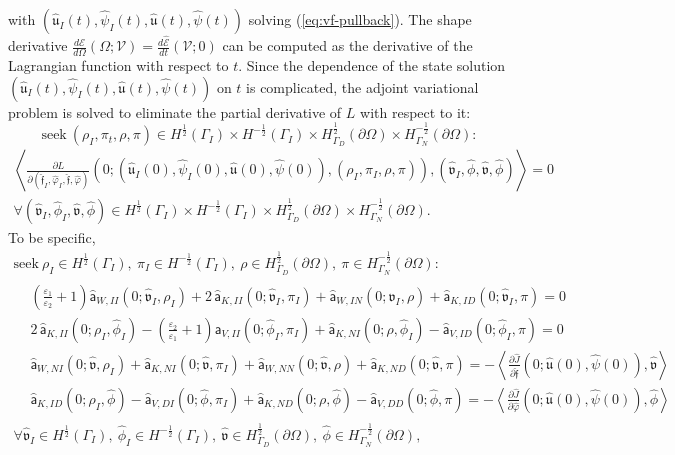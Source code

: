 \documentclass{article}
\theoremstyle{remark}
\newcommand{\aaa}{\mathsf{a}}
\newcommand{\hata}{\widehat{\aaa}}
\newcommand{\argu}{\mathfrak{u}}
\newcommand{\argv}{\mathfrak{v}}
\newcommand{\argf}{\mathfrak{f}}
\newcommand{\hatu}{\widehat{\argu}}
\newcommand{\hatv}{\widehat{\argv}}
\newcommand{\hatf}{\widehat{\argf}}
\newcommand{\hatpsi}{\widehat{\psi}}
\newcommand{\hatphi}{\widehat{\phi}}
\newcommand{\hatvphi}{\widehat{\varphi}}
\newcommand{\Eps}{\mathcal{E}}
\newcommand{\hatEps}{\widehat{\Eps}}
\newcommand{\hatJ}{\widehat{J}}
\newcommand{\Nu}{\mathcal{V}}
\begin{document}
with $(\hatu_I(t),\hatpsi_I(t),\hatu(t),\hatpsi(t))$ solving (\ref{eq:vf-pullback}). The shape derivative $\frac{d\Eps}{d\Omega}(\Omega;\Nu)=\frac{d\hatEps}{dt}(\Nu;0)$ can be computed as the derivative of the Lagrangian function with respect to $t$. Since the dependence of the state solution $(\hatu_I(t),\hatpsi_I(t),\hatu(t),\hatpsi(t))$ on $t$ is complicated, the adjoint variational problem is solved to eliminate the partial derivative of $L$ with respect to it:
\begin{equation*}
    \text{seek}~(\rho_I,\pi_t,\rho,\pi)\in H^{\frac{1}{2}}(\Gamma_I)\times H^{-\frac{1}{2}}(\Gamma_I)\times H^{\frac{1}{2}}_{\Gamma_D}(\partial\Omega)\times H^{-\frac{1}{2}}_{\Gamma_N}(\partial\Omega):
\end{equation*}
\begin{multline}
    \left<\frac{\partial L}{\partial(\hatf_I,\hatvphi_I,\hatf,\hatvphi)}(0;(\hatu_I(0),\hatpsi_I(0),\hatu(0),\hatpsi(0)),(\rho_I,\pi_I,\rho,\pi)),(\hatv_I,\hatphi,\hatv,\hatphi)\right>=0\\
    \forall(\hatv_I,\hatphi_I,\hatv,\hatphi)\in H^{\frac{1}{2}}(\Gamma_I)\times H^{-\frac{1}{2}}(\Gamma_I)\times H^{\frac{1}{2}}_{\Gamma_D}(\partial\Omega)\times H^{-\frac{1}{2}}_{\Gamma_N}(\partial\Omega).
\end{multline}
To be specific,
\begin{equation}
\begin{gathered}
    \text{seek}~\rho_I\in H^{\frac{1}{2}}(\Gamma_I),
    ~\pi_I\in H^{-\frac{1}{2}}(\Gamma_I),
    ~\rho\in H^{\frac{1}{2}}_{\Gamma_D}(\partial\Omega),
    ~\pi\in H^{-\frac{1}{2}}_{\Gamma_N}(\partial\Omega):\\
    \begin{aligned}
    &\left(\frac{\varepsilon_1}{\varepsilon_2}+1\right)\hata_{W,II}(0;\hatv_I,\rho_I)+2\,\hata_{K,II}(0;\hatv_I,\pi_I)+\hata_{W,IN}(0;\hatv_I,\rho)+\hata_{K,ID}(0;\hatv_I,\pi)=0\quad
    \\
    &2\,\hata_{K,II}(0;\rho_I,\hatphi_I)-\left(\frac{\varepsilon_2}{\varepsilon_1}+1\right)\hata_{V,II}(0;\hatphi_I,\pi_I)+\hata_{K,NI}(0;\rho,\hatphi_I)-\hata_{V,ID}(0;\hatphi_I,\pi)=0\quad
    \\
    &\hata_{W,NI}(0;\hatv,\rho_I)+\hata_{K,NI}(0;\hatv,\pi_I)+\hata_{W,NN}(0;\hatv,\rho)+\hata_{K,ND}(0;\hatv,\pi)
    =-\left<\frac{\partial\hatJ}{\partial\hatf}(0;\hatu(0),\hatpsi(0)),\hatv\right>
    \\
    &\hata_{K,ID}(0;\rho_I,\hatphi)-\hata_{V,DI}(0;\hatphi,\pi_I)+\hata_{K,ND}(0;\rho,\hatphi)-\hata_{V,DD}(0;\hatphi,\pi)
    =-\left<\frac{\partial\hatJ}{\partial\hatvphi}(0;\hatu(0),\hatpsi(0)),\hatphi\right>
    \end{aligned}\\
    \forall\hatv_I\in H^{\frac{1}{2}}(\Gamma_I),~\hatphi_I\in H^{-\frac{1}{2}}(\Gamma_I),~\hatv\in H^{\frac{1}{2}}_{\Gamma_D}(\partial\Omega),~\hatphi\in H^{-\frac{1}{2}}_{\Gamma_N}(\partial\Omega),
\end{gathered}
\end{equation}
\end{document}
